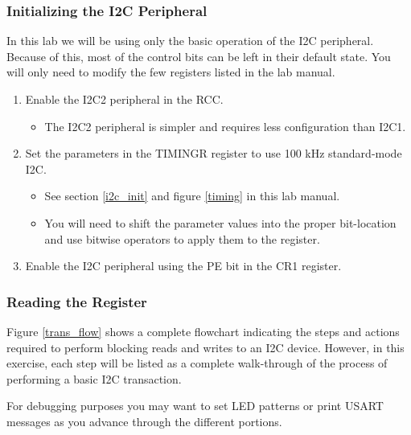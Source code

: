 \documentclass[openany,11pt,fleqn]{book} %
\begin{document}
\subsubsection{Initializing the I2C Peripheral}
In this lab we will be using only the basic operation of the I2C peripheral. Because of this, most of the control bits can be left in their default state. You will only need to modify the few registers listed in the lab manual. 

\begin{enumerate}
    \item Enable the I2C2 peripheral in the RCC.
    \begin{itemize}
        \item The I2C2 peripheral is simpler and requires less configuration than I2C1.
    \end{itemize}
    \item Set the parameters in the TIMINGR register to use 100 kHz standard-mode I2C. 
    \begin{itemize}
        \item See section \ref{i2c_init} and figure \ref{timing} in this lab manual.
        \item You will need to shift the parameter values into the proper bit-location and use bitwise operators to apply them to the register. 
    \end{itemize}
    \item Enable the I2C peripheral using the PE bit in the CR1 register. 
\end{enumerate}

\subsubsection{Reading the Register}
Figure \ref{trans_flow} shows a complete flowchart indicating the steps and actions required to perform blocking reads and writes to an I2C device. However, in this exercise, each step will be listed as a complete walk-through of the process of performing a basic I2C transaction. 

For debugging purposes you may want to set LED patterns or print USART messages as you advance through the different portions.
\end{document}
